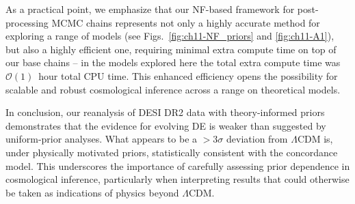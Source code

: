 As a practical point, we emphasize that our NF-based framework for post-processing MCMC chains represents not only a highly accurate method for exploring a range of models (see Figs.~\ref{fig:ch11-NF_priors} and \ref{fig:ch11-A1}),  but also a highly efficient one, requiring minimal extra compute time on top of our base chains -- in the models explored here the total extra compute time was $\mathcal{O}(1)$~hour total CPU time. This enhanced efficiency opens the possibility for scalable and robust cosmological inference across a range on theoretical models.


In conclusion, our reanalysis of DESI DR2 data with theory-informed priors demonstrates that the evidence for evolving DE is weaker than suggested by uniform-prior analyses. What appears to be a $>3\sigma$ deviation from $\Lambda$CDM is, under physically motivated priors, statistically consistent with the concordance model. This underscores the importance of carefully assessing prior dependence in cosmological inference, particularly when interpreting results that could otherwise be taken as indications of physics beyond $\Lambda$CDM.


